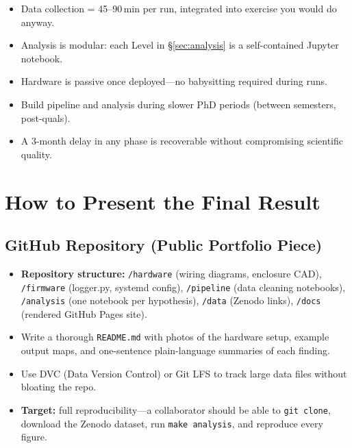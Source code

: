 \documentclass[11pt, letterpaper]{article}
\begin{document}
\begin{tcolorbox}[callout, title={PhD Compatibility Notes}]
\begin{itemize}[topsep=0pt]
  \item Data collection = 45--90\,min per run, integrated into exercise you would do anyway.
  \item Analysis is modular: each Level in \S\ref{sec:analysis} is a self-contained Jupyter notebook.
  \item Hardware is passive once deployed---no babysitting required during runs.
  \item Build pipeline and analysis during slower PhD periods (between semesters, post-quals).
  \item A 3-month delay in any phase is recoverable without compromising scientific quality.
\end{itemize}
\end{tcolorbox}

\newpage

\section{How to Present the Final Result}
\label{sec:present}

\subsection{GitHub Repository (Public Portfolio Piece)}
\begin{itemize}
  \item \textbf{Repository structure:} \texttt{/hardware} (wiring diagrams, enclosure CAD), \texttt{/firmware} (logger.py, systemd config), \texttt{/pipeline} (data cleaning notebooks), \texttt{/analysis} (one notebook per hypothesis), \texttt{/data} (Zenodo links), \texttt{/docs} (rendered GitHub Pages site).
  \item Write a thorough \texttt{README.md} with photos of the hardware setup, example output maps, and one-sentence plain-language summaries of each finding.
  \item Use DVC (Data Version Control) or Git LFS to track large data files without bloating the repo.
  \item \textbf{Target:} full reproducibility---a collaborator should be able to \texttt{git clone}, download the Zenodo dataset, run \texttt{make analysis}, and reproduce every figure.
\end{itemize}
\end{document}
